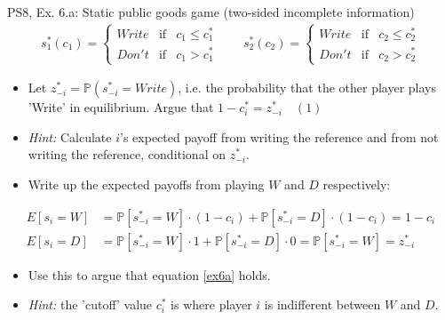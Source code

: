 \begin{frame}{PS8, Ex. 6.a: Static public goods game (two-sided incomplete information)}
    \begin{align*}
      s_1^*(c_1)=\left\{\begin{array}{rcl}
        Write & \text{if} & c_1\leq c_1^*\\
        Don't & \text{if} & c_1>c_1^*
        \end{array}\right.\quad\quad
      s_2^*(c_2)=\left\{\begin{array}{rcl}
        Write & \text{if} & c_2\leq c_2^*\\
        Don't & \text{if} & c_2>c_2^*
        \end{array}\right.
    \end{align*}
    \vspace{-12pt}
    \begin{itemize}
      \item[(a)] Let $z_{-i}^* = \mathbb{P}(s_{-i}^*=Write)$, i.e. the probability that the other player plays 'Write' in equilibrium. Argue that $1-c_i^*=z_{-i}^*\quad(1)$
      \item[] \textit{Hint:} Calculate $i$'s expected payoff from writing the reference and from not writing the reference, conditional on $z_{-i}^*$.
    \end{itemize}
    \vspace{-8pt}
    \begin{itemize}
      \item[Step 1:] Write up the expected payoffs from playing $W$ and $D$ respectively:
    \end{itemize}
    \vspace{-8pt}
    \begin{align*}
      E[s_i=W]&=\mathbb{P}\left[s_{-i}^*=W\right]\cdot(1-c_i)+\mathbb{P}\left[s_{-i}^*=D\right]\cdot(1-c_i)=1-c_i\\
      E[s_i=D]&=\mathbb{P}\left[s_{-i}^*=W\right]\cdot1+\mathbb{P}\left[s_{-i}^*=D\right]\cdot0=\mathbb{P}\left[s_{-i}^*=W\right]=z_{-i}^*
    \end{align*}
    \vspace{-16pt}
    \begin{itemize}
      \item[Step 2:] Use this to argue that equation \eqref{ex6a} holds.
      \item[]        \textit{Hint:} the 'cutoff' value $c_i^*$ is where player $i$ is indifferent between $W$ and $D$.
    \end{itemize}
    \vfill\null
\end{frame}
